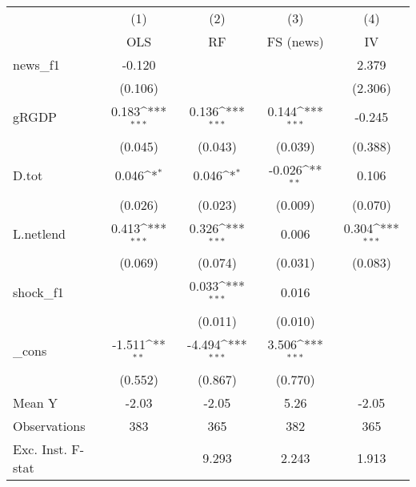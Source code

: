 {
\def\sym#1{\ifmmode^{#1}\else\(^{#1}\)\fi}
\begin{tabular}{l*{4}{c}}
\toprule
            &\multicolumn{1}{c}{(1)}&\multicolumn{1}{c}{(2)}&\multicolumn{1}{c}{(3)}&\multicolumn{1}{c}{(4)}\\
            &\multicolumn{1}{c}{OLS}&\multicolumn{1}{c}{RF}&\multicolumn{1}{c}{FS (news)}&\multicolumn{1}{c}{IV}\\
\midrule
news\_f1     &      -0.120         &                     &                     &       2.379         \\
            &     (0.106)         &                     &                     &     (2.306)         \\
\addlinespace
gRGDP       &       0.183\sym{***}&       0.136\sym{***}&       0.144\sym{***}&      -0.245         \\
            &     (0.045)         &     (0.043)         &     (0.039)         &     (0.388)         \\
\addlinespace
D.tot       &       0.046\sym{*}  &       0.046\sym{*}  &      -0.026\sym{**} &       0.106         \\
            &     (0.026)         &     (0.023)         &     (0.009)         &     (0.070)         \\
\addlinespace
L.netlend   &       0.413\sym{***}&       0.326\sym{***}&       0.006         &       0.304\sym{***}\\
            &     (0.069)         &     (0.074)         &     (0.031)         &     (0.083)         \\
\addlinespace
shock\_f1    &                     &       0.033\sym{***}&       0.016         &                     \\
            &                     &     (0.011)         &     (0.010)         &                     \\
\addlinespace
\_cons      &      -1.511\sym{**} &      -4.494\sym{***}&       3.506\sym{***}&                     \\
            &     (0.552)         &     (0.867)         &     (0.770)         &                     \\
\midrule
Mean Y      &       -2.03         &       -2.05         &        5.26         &       -2.05         \\
Observations&         383         &         365         &         382         &         365         \\
Exc. Inst. F-stat&                     &       9.293         &       2.243         &       1.913         \\
\bottomrule
\end{tabular}
}
